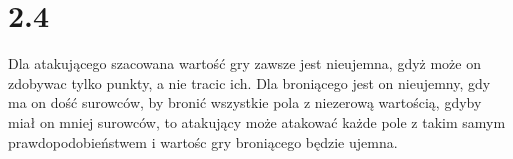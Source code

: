 \documentclass{article}
\begin{document}
\section*{2.4}
\begin{flushleft}
    Dla atakującego szacowana wartość gry zawsze jest nieujemna, gdyż może on zdobywac tylko punkty, a nie tracic ich. Dla broniącego jest on nieujemny, gdy ma on dość surowców, by bronić wszystkie pola z niezerową wartością, gdyby miał on mniej surowców, to atakujący może atakować każde pole z takim samym prawdopodobieństwem i wartośc gry broniącego będzie ujemna.
\end{flushleft}
\end{document}
